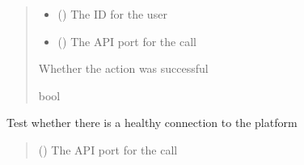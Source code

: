 \documentclass[letterpaper,10pt,english]{sphinxmanual}
\begin{document}
\begin{fulllineitems}
\begin{fulllineitems}
\begin{quote}
\begin{description}
\begin{itemize}
\item {} 
\sphinxAtStartPar
{} () \textendash{} The ID for the user

\item {} 
\sphinxAtStartPar
{} (\sphinxstyleliteralemphasis{\sphinxupquote{ (}}\sphinxstyleliteralemphasis{\sphinxupquote{)}}) \textendash{} The API port for the call

\end{itemize}

\sphinxAtStartPar
{} \textendash{} Whether the action was successful

\sphinxAtStartPar
bool

\end{description}\end{quote}

\end{fulllineitems}


\begin{fulllineitems}
\label{\detokenize{aisquared.platform:aisquared.platform.AISquaredPlatformClient.AISquaredPlatformClient.test_connection}}
\pysigstartsignatures
{}
\pysigstopsignatures
\sphinxAtStartPar
Test whether there is a healthy connection to the platform

\begin{sphinxVerbatim}[commandchars=\\\{\}]
 
  
\end{sphinxVerbatim}
\begin{quote}\begin{description}
\sphinxAtStartPar
{} (\sphinxstyleliteralemphasis{\sphinxupquote{ (}}\sphinxstyleliteralemphasis{\sphinxupquote{)}}) \textendash{} The API port for the call


\end{description}
\end{quote}
\end{fulllineitems}
\end{fulllineitems}
\end{document}
